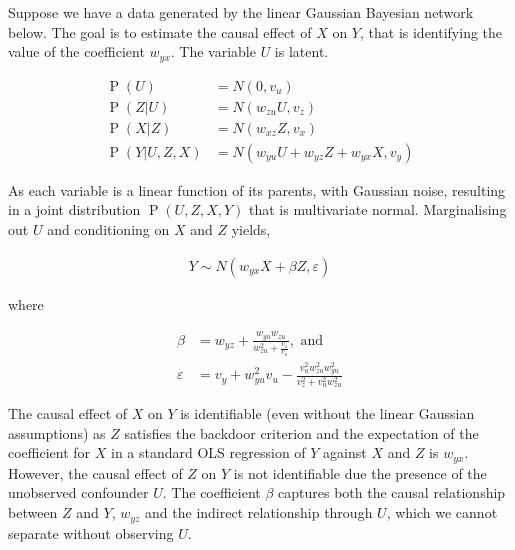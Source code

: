 \documentclass[11pt,a4paper,oneside]{book}
\newcommand{\eqn}[1]{\begin{align}#1\end{align}}
\renewcommand{\P}[1]{\operatorname{P}\left(#1\right)}
\theoremstyle{plain}
\theoremstyle{definition}
\let\epsilon\varepsilon
\begin{document}
Suppose we have a data generated by the linear Gaussian Bayesian network below. The goal is to estimate the causal effect of $X$ on $Y$, that is identifying the value of the coefficient $w_{yx}$. The variable $U$ is latent. 

\eqn{
\P{U} &= N(0 , v_u) \\
\label{eqn:careful_with_priors}
\P{Z|U} &= N(w_{zu}U , v_z) \\
\P{X|Z} &= N(w_{xz}Z , v_x) \\
\P{Y|U,Z,X} & = N(w_{yu}U +w_{yz}Z + w_{yx}X , v_y)
}

\begin{figure}[h]
\centering
{} 
\caption{ }
\label{fig:careful_with_priors}
\end{figure}

As each variable is a linear function of its parents, with Gaussian noise, resulting in a joint distribution $\P{U,Z,X,Y}$ that is multivariate normal. Marginalising out $U$ and conditioning on $X$ and $Z$ yields,

\eqn{
Y \sim N(w_{yx} X + \beta Z, \epsilon) 
}

where

\eqn{
\beta &= w_{yz}+\frac{w_{yu}w_{zu}}{w_{zu}^2+\frac{v_z}{v_u}}, \text{ and}\\
\epsilon &= v_y + w_{yu}^2v_u - \frac{v_u^2 w_{zu}^2 w_{yu}^2 }{v_z^2+v_u^2 w_{zu}^2}
}

The causal effect of $X$ on $Y$ is identifiable (even without the linear Gaussian assumptions) as $Z$ satisfies the backdoor criterion and the expectation of the coefficient for $X$ in a standard OLS regression of $Y$ against $X$ and $Z$ is $w_{yx}$. However, the causal effect of $Z$ on $Y$ is not identifiable due the presence of the unobserved confounder $U$. The coefficient $\beta$ captures both the causal relationship between $Z$ and $Y$, $w_{yz}$ and the indirect relationship through $U$, which we cannot separate without observing $U$. 
\end{document}

